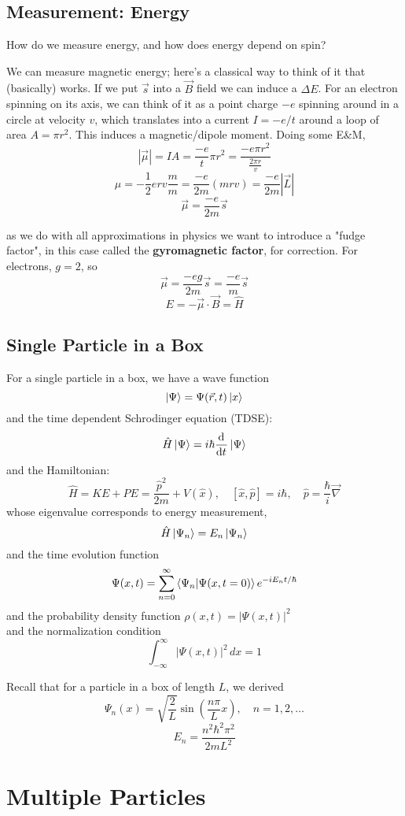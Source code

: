 \documentclass[11pt]{article}
\begin{document}
\subsection*{Measurement: Energy}
How do we measure energy, and how does energy depend on spin?

We can measure magnetic energy; here's a classical way to think of it that (basically) works. If we put $\vec{s}$ into a $\vec{B}$ field we can induce a $\Delta E$. For an electron spinning on its axis, we can think of it as a point charge $-e$ spinning around in a circle at velocity $v$, which translates into a current $I = -e/t$ around a loop of area $A = \pi r^2$. This induces a magnetic/dipole moment. Doing some E\&M,
\[|\vec{\mu}| = IA = \frac{-e}{t}\pi r^2 = \frac{-e\pi r^2}{\frac{2\pi r}{v}}\]
\[\mu = -\frac{1}{2}erv\frac{m}{m} = \frac{-e}{2m}(mrv) = \frac{-e}{2m}|\vec{L}|\]
\[\vec{\mu} = \frac{-e}{2m}\vec{s}\]

as we do with all approximations in physics we want to introduce a "fudge factor", in this case called the \textbf{gyromagnetic factor}, for correction. For electrons, $g = 2$, so
\[\vec{\mu} = \frac{-eg}{2m} \vec{s} = \frac{-e}{m}\vec{s}\]
\[E = - \vec{\mu}\cdot \vec{B} = \hat{H}\]

\subsection*{Single Particle in a Box}

For a single particle in a box, we have a wave function
\[\ket{\Psi} = \Psi(\vec{r}, t)\ket{x}\]
and the time dependent Schrodinger equation (TDSE):
\[\hat{H}\ket{\Psi} = i\hbar\frac{\mathrm{d}^{} }{\mathrm{d} t^{}}\ket{\Psi}\]
and the Hamiltonian:
\[\hat{H} = KE + PE = \frac{\hat{p}^2}{2m} + V(\hat{x}), \quad [\hat{x}, \hat{p}] = i\hbar, \quad \hat{p} = \frac{\hbar}{i}\vec{\nabla}\]
whose eigenvalue corresponds to energy measurement,
\[\hat{H}\ket{\Psi_n} = E_n\ket{\Psi_n}\]
and the time evolution function
\[\Psi(x, t) = \sum_{n=0}^{\infty} \braket{\Psi_n| \Psi(x, t=0)} e^{-iE_n t/\hbar}\]
and the probability density function $\rho(x, t) = |\Psi(x, t)|^2$\\
and the normalization condition
\[\int_{-\infty}^{\infty} |\Psi(x, t)|^2 \, dx = 1\]

Recall that for a particle in a box of length $L$, we derived
\[\Psi_n(x) = \sqrt{\frac{2}{L}}\sin\left( \frac{n\pi}{L}x\right), \quad n = 1, 2,\ldots\]
\[E_n = \frac{n^2\hbar^2\pi^2}{2mL^2}\]

\section{Multiple Particles}
\end{document}
